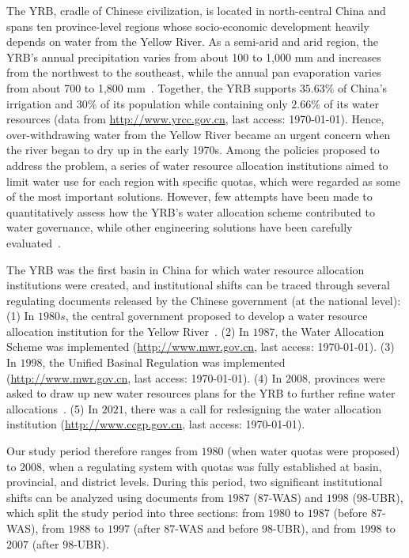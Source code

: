 \documentclass[preprint, 12pt]{elsarticle}
\begin{document}
The YRB, cradle of Chinese civilization, is located in north-central China and spans ten province-level regions whose socio-economic development heavily depends on water from the Yellow River.
As a semi-arid and arid region, the YRB's annual precipitation varies from about 100 to 1,000 mm and increases from the northwest to the southeast, while the annual pan evaporation varies from about 700 to 1,800 mm~\cite{wang2022e}.
Together, the YRB supports $35.63\%$ of China's irrigation and $30\%$ of its population while containing only $2.66\%$ of its water resources (data from \href{http://www.yrcc.gov.cn}{http://www.yrcc.gov.cn}, last access: \today).
Hence, over-withdrawing water from the Yellow River became an urgent concern when the river began to dry up in the early 1970s.
Among the policies proposed to address the problem, a series of water resource allocation institutions aimed to limit water use for each region with specific quotas, which were regarded as some of the most important solutions.
However, few attempts have been made to quantitatively assess how the YRB's water allocation scheme contributed to water governance, while other engineering solutions have been carefully evaluated~\cite{long2020}.




The YRB was the first basin in China for which water resource allocation institutions were created, and institutional shifts can be traced through several regulating documents released by the Chinese government (at the national level):
(1) In $1980s$, the central government proposed to develop a water resource allocation institution for the Yellow River~\cite{wang2019d, wang2019e}.
(2) In $1987$, the Water Allocation Scheme was implemented (\href{http://www.gov.cn/zhengce/content/2011-03/30/content_3138.htm#}{http://www.mwr.gov.cn}, last access: \today).
(3) In $1998$, the Unified Basinal Regulation was implemented (\href{http://www.mwr.gov.cn/ztpd/2013ztbd/2013fxkh/fxkhswcbcs/cs/flfg/201304/t20130411_433489.html}{http://www.mwr.gov.cn}, last access: \today).
(4) In $2008$, provinces were asked to draw up new water resources plans for the YRB to further refine water allocations~\cite{wang2019d,wang2019e}.
(5) In $2021$, there was a call for redesigning the water allocation institution (\href{http://www.ccgp.gov.cn/cggg/zygg/gkzb/202107/t20210721_16591901.htm}{http://www.ccgp.gov.cn}, last access: \today).

Our study period therefore ranges from $1980$ (when water quotas were proposed) to $2008$, when a regulating system with quotas was fully established at basin, provincial, and district levels.
During this period, two significant institutional shifts can be analyzed using documents from $1987$ (87-WAS) and $1998$ (98-UBR), which split the study period into three sections: from $1980$ to $1987$ (before 87-WAS), from $1988$ to $1997$ (after 87-WAS and before 98-UBR), and from $1998$ to $2007$ (after 98-UBR).
\end{document}
